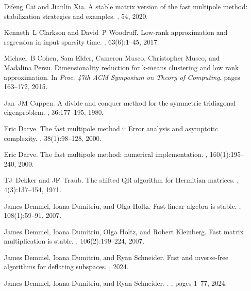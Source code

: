 \documentclass{article}
\begin{document}
\begin{thebibliography}{10}
Difeng Cai and Jianlin Xia.
\newblock A stable matrix version of the fast multipole method: stabilization strategies and examples.
, 54, 2020.

Kenneth~L Clarkson and David~P Woodruff.
\newblock Low-rank approximation and regression in input sparsity time.
, 63(6):1--45, 2017.

Michael~B Cohen, Sam Elder, Cameron Musco, Christopher Musco, and Madalina Persu.
\newblock Dimensionality reduction for k-means clustering and low rank approximation.
\newblock In {\em Proc. 47th ACM Symposium on Theory of Computing}, pages 163--172, 2015.

Jan~JM Cuppen.
\newblock A divide and conquer method for the symmetric tridiagonal eigenproblem.
, 36:177--195, 1980.

Eric Darve.
\newblock The fast multipole method i: Error analysis and asymptotic complexity.
, 38(1):98--128, 2000.

Eric Darve.
\newblock The fast multipole method: numerical implementation.
, 160(1):195--240, 2000.

TJ~Dekker and JF~Traub.
\newblock The shifted {QR} algorithm for {Hermitian} matrices.
, 4(3):137--154, 1971.

James Demmel, Ioana Dumitriu, and Olga Holtz.
\newblock Fast linear algebra is stable.
, 108(1):59--91, 2007.

James Demmel, Ioana Dumitriu, Olga Holtz, and Robert Kleinberg.
\newblock Fast matrix multiplication is stable.
, 106(2):199--224, 2007.

James Demmel, Ioana Dumitriu, and Ryan Schneider.
\newblock Fast and inverse-free algorithms for deflating subspaces.
, 2024.

James Demmel, Ioana Dumitriu, and Ryan Schneider.
.
, pages 1--77, 2024.


\end{thebibliography}
\end{document}
